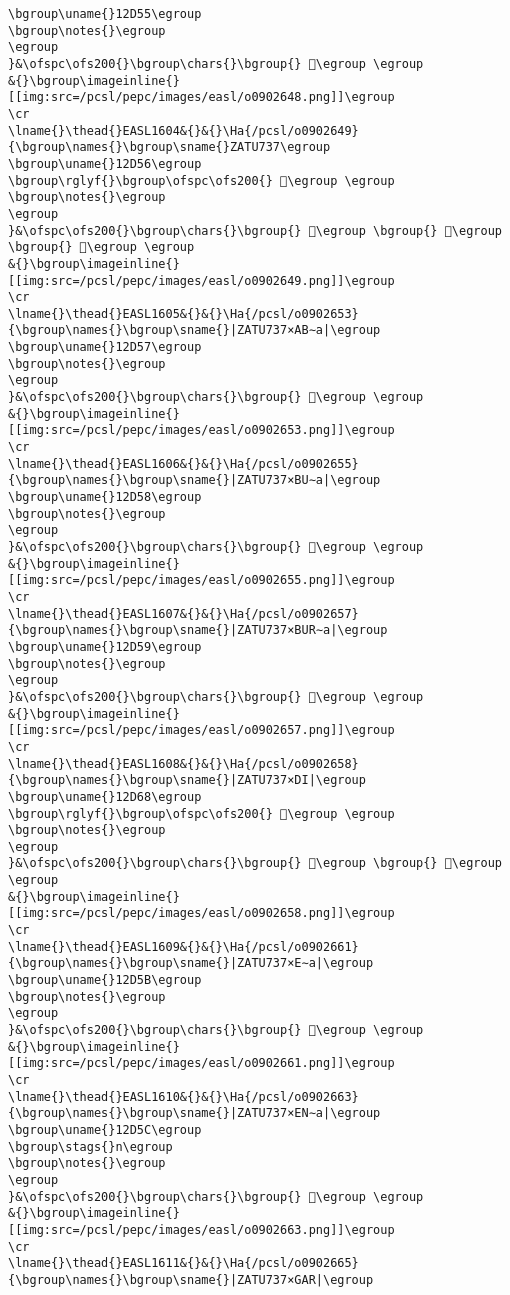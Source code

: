 \begin{verbatim}
\bgroup\uname{}12D55\egroup
\bgroup\notes{}\egroup
\egroup
}&\ofspc\ofs200{}\bgroup\chars{}\bgroup{} 𒵕\egroup \egroup
&{}\bgroup\imageinline{}[[img:src=/pcsl/pepc/images/easl/o0902648.png]]\egroup
\cr
\lname{}\thead{}EASL1604&{}&{}\Ha{/pcsl/o0902649}{\bgroup\names{}\bgroup\sname{}ZATU737\egroup
\bgroup\uname{}12D56\egroup
\bgroup\rglyf{}\bgroup\ofspc\ofs200{} 𒵖\egroup \egroup
\bgroup\notes{}\egroup
\egroup
}&\ofspc\ofs200{}\bgroup\chars{}\bgroup{} 𒵖\egroup \bgroup{} 𒵤\egroup \bgroup{} 𒵧\egroup \egroup
&{}\bgroup\imageinline{}[[img:src=/pcsl/pepc/images/easl/o0902649.png]]\egroup
\cr
\lname{}\thead{}EASL1605&{}&{}\Ha{/pcsl/o0902653}{\bgroup\names{}\bgroup\sname{}|ZATU737×AB∼a|\egroup
\bgroup\uname{}12D57\egroup
\bgroup\notes{}\egroup
\egroup
}&\ofspc\ofs200{}\bgroup\chars{}\bgroup{} 𒵗\egroup \egroup
&{}\bgroup\imageinline{}[[img:src=/pcsl/pepc/images/easl/o0902653.png]]\egroup
\cr
\lname{}\thead{}EASL1606&{}&{}\Ha{/pcsl/o0902655}{\bgroup\names{}\bgroup\sname{}|ZATU737×BU∼a|\egroup
\bgroup\uname{}12D58\egroup
\bgroup\notes{}\egroup
\egroup
}&\ofspc\ofs200{}\bgroup\chars{}\bgroup{} 𒵘\egroup \egroup
&{}\bgroup\imageinline{}[[img:src=/pcsl/pepc/images/easl/o0902655.png]]\egroup
\cr
\lname{}\thead{}EASL1607&{}&{}\Ha{/pcsl/o0902657}{\bgroup\names{}\bgroup\sname{}|ZATU737×BUR∼a|\egroup
\bgroup\uname{}12D59\egroup
\bgroup\notes{}\egroup
\egroup
}&\ofspc\ofs200{}\bgroup\chars{}\bgroup{} 𒵙\egroup \egroup
&{}\bgroup\imageinline{}[[img:src=/pcsl/pepc/images/easl/o0902657.png]]\egroup
\cr
\lname{}\thead{}EASL1608&{}&{}\Ha{/pcsl/o0902658}{\bgroup\names{}\bgroup\sname{}|ZATU737×DI|\egroup
\bgroup\uname{}12D68\egroup
\bgroup\rglyf{}\bgroup\ofspc\ofs200{} 𒵨\egroup \egroup
\bgroup\notes{}\egroup
\egroup
}&\ofspc\ofs200{}\bgroup\chars{}\bgroup{} 𒵚\egroup \bgroup{} 𒵨\egroup \egroup
&{}\bgroup\imageinline{}[[img:src=/pcsl/pepc/images/easl/o0902658.png]]\egroup
\cr
\lname{}\thead{}EASL1609&{}&{}\Ha{/pcsl/o0902661}{\bgroup\names{}\bgroup\sname{}|ZATU737×E∼a|\egroup
\bgroup\uname{}12D5B\egroup
\bgroup\notes{}\egroup
\egroup
}&\ofspc\ofs200{}\bgroup\chars{}\bgroup{} 𒵛\egroup \egroup
&{}\bgroup\imageinline{}[[img:src=/pcsl/pepc/images/easl/o0902661.png]]\egroup
\cr
\lname{}\thead{}EASL1610&{}&{}\Ha{/pcsl/o0902663}{\bgroup\names{}\bgroup\sname{}|ZATU737×EN∼a|\egroup
\bgroup\uname{}12D5C\egroup
\bgroup\stags{}n\egroup
\bgroup\notes{}\egroup
\egroup
}&\ofspc\ofs200{}\bgroup\chars{}\bgroup{} 𒵜\egroup \egroup
&{}\bgroup\imageinline{}[[img:src=/pcsl/pepc/images/easl/o0902663.png]]\egroup
\cr
\lname{}\thead{}EASL1611&{}&{}\Ha{/pcsl/o0902665}{\bgroup\names{}\bgroup\sname{}|ZATU737×GAR|\egroup

\end{verbatim}

